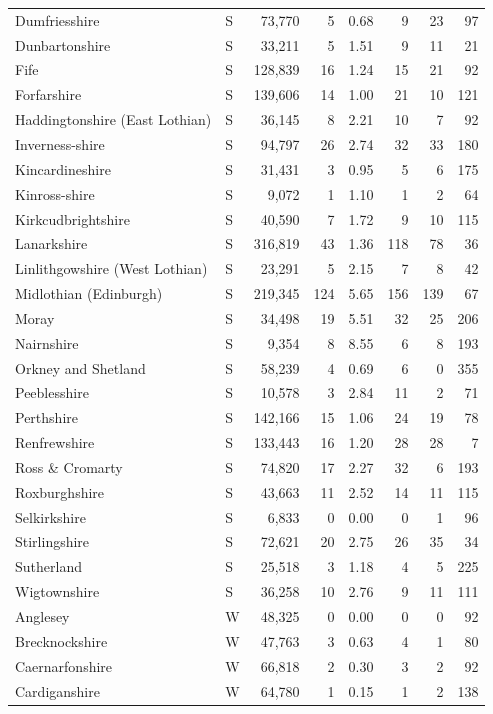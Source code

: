 \documentclass[11pt,a4paper]{article}
\begin{document}
{\begin{longtable}{llrrrrrr}
Dumfriesshire & S & 73,770 & 5 & 0.68 & 9 & 23 & 97\\
Dunbartonshire & S & 33,211 & 5 & 1.51 & 9 & 11 & 21\\
Fife & S & 128,839 & 16 & 1.24 & 15 & 21 & 92\\
Forfarshire & S & 139,606 & 14 & 1.00 & 21 & 10 & 121\\
Haddingtonshire (East Lothian) & S & 36,145 & 8 & 2.21 & 10 & 7 & 92\\
Inverness-shire & S & 94,797 & 26 & 2.74 & 32 & 33 & 180\\
Kincardineshire & S & 31,431 & 3 & 0.95 & 5 & 6 & 175\\
Kinross-shire & S & 9,072 & 1 & 1.10 & 1 & 2 & 64\\
Kirkcudbrightshire & S & 40,590 & 7 & 1.72 & 9 & 10 & 115\\
Lanarkshire & S & 316,819 & 43 & 1.36 & 118 & 78 & 36\\
Linlithgowshire (West Lothian) & S & 23,291 & 5 & 2.15 & 7 & 8 & 42\\
Midlothian (Edinburgh) & S & 219,345 & 124 & 5.65 & 156 & 139 & 67\\
Moray & S & 34,498 & 19 & 5.51 & 32 & 25 & 206\\
Nairnshire & S & 9,354 & 8 & 8.55 & 6 & 8 & 193\\
Orkney and Shetland & S & 58,239 & 4 & 0.69 & 6 & 0 & 355\\
Peeblesshire & S & 10,578 & 3 & 2.84 & 11 & 2 & 71\\
Perthshire & S & 142,166 & 15 & 1.06 & 24 & 19 & 78\\
Renfrewshire & S & 133,443 & 16 & 1.20 & 28 & 28 & 7\\
Ross \& Cromarty & S & 74,820 & 17 & 2.27 & 32 & 6 & 193\\
Roxburghshire & S & 43,663 & 11 & 2.52 & 14 & 11 & 115\\
Selkirkshire & S & 6,833 & 0 & 0.00 & 0 & 1 & 96\\
Stirlingshire & S & 72,621 & 20 & 2.75 & 26 & 35 & 34\\
Sutherland & S & 25,518 & 3 & 1.18 & 4 & 5 & 225\\
Wigtownshire & S & 36,258 & 10 & 2.76 & 9 & 11 & 111\\
Anglesey & W & 48,325 & 0 & 0.00 & 0 & 0 & 92\\
Brecknockshire & W & 47,763 & 3 & 0.63 & 4 & 1 & 80\\
Caernarfonshire & W & 66,818 & 2 & 0.30 & 3 & 2 & 92\\
Cardiganshire & W & 64,780 & 1 & 0.15 & 1 & 2 & 138\\

\end{longtable}}
\end{document}
